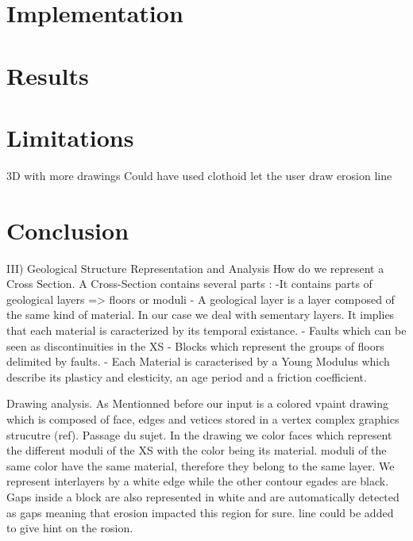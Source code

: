 \documentclass[12pt, a4paper]{memoir} %
\begin{document}
\section{Implementation}
\section{Results}
\section{Limitations}
3D with more drawings
Could have used clothoid
let the user draw erosion line
\section{Conclusion}


III) Geological Structure Representation and Analysis
	How do we represent a Cross Section.
	A Cross-Section contains several parts : 
		-It contains parts of geological layers => floors or moduli
		- A geological layer is a layer composed of the same kind of material.
		In our case we deal with sementary layers. It implies that each material is caracterized by its temporal existance.	
	   	- Faults which can be seen as discontinuities in the XS
		- Blocks which represent the groups of floors delimited by faults.
		- Each Material is caracterised by a Young Modulus which describe its plasticy and elesticity,
		an age period and a friction coefficient.

Drawing analysis. As Mentionned before our input is a colored vpaint drawing which is composed of face, edges and vetices stored in 
a vertex complex graphics strucutre (ref). Passage du sujet.
In the drawing we color faces which represent the different moduli of the XS with the color being its material. moduli of the same color have the same material, therefore they belong to the same layer. We represent interlayers by a white edge while the other contour egades are black. Gaps inside a block are also represented in white and are automatically detected as gaps meaning that erosion impacted this region for sure. line could be added to give hint on the rosion.
\end{document}
